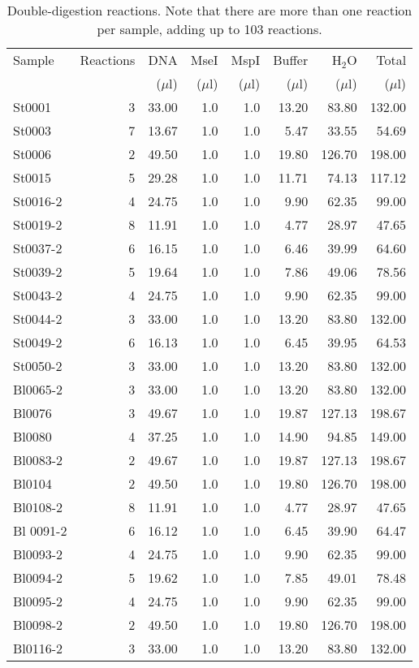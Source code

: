 \documentclass[a4paper,12pt,twosided]{article}
\begin{document}
\begin{table}
\begin{center}
\caption{Double-digestion reactions. Note that there are more than one reaction per sample, adding up to 103 reactions.}\label{tau:digest}
\vspace*{0.2cm}
\begin{tabular}{lrrrrrrr}
\toprule
Sample&Reactions&DNA&MseI&MspI&Buffer&H$_2$O&Total\\
&&($\mu$l)&($\mu$l)&($\mu$l)&($\mu$l)&($\mu$l)&($\mu$l)\\
\midrule
St0001&3&33.00&1.0&1.0&13.20&83.80&132.00\\
St0003&7&13.67&1.0&1.0&5.47&33.55&54.69\\
St0006&2&49.50&1.0&1.0&19.80&126.70&198.00\\
St0015&5&29.28&1.0&1.0&11.71&74.13&117.12\\
St0016-2&4&24.75&1.0&1.0&9.90&62.35&99.00\\
St0019-2&8&11.91&1.0&1.0&4.77&28.97&47.65\\
St0037-2&6&16.15&1.0&1.0&6.46&39.99&64.60\\
St0039-2&5&19.64&1.0&1.0&7.86&49.06&78.56\\
St0043-2&4&24.75&1.0&1.0&9.90&62.35&99.00\\
St0044-2&3&33.00&1.0&1.0&13.20&83.80&132.00\\
St0049-2&6&16.13&1.0&1.0&6.45&39.95&64.53\\
St0050-2&3&33.00&1.0&1.0&13.20&83.80&132.00\\
Bl0065-2&3&33.00&1.0&1.0&13.20&83.80&132.00\\
Bl0076&3&49.67&1.0&1.0&19.87&127.13&198.67\\
Bl0080&4&37.25&1.0&1.0&14.90&94.85&149.00\\
Bl0083-2&2&49.67&1.0&1.0&19.87&127.13&198.67\\
Bl0104&2&49.50&1.0&1.0&19.80&126.70&198.00\\
Bl0108-2&8&11.91&1.0&1.0&4.77&28.97&47.65\\
Bl 0091-2&6&16.12&1.0&1.0&6.45&39.90&64.47\\
Bl0093-2&4&24.75&1.0&1.0&9.90&62.35&99.00\\
Bl0094-2&5&19.62&1.0&1.0&7.85&49.01&78.48\\
Bl0095-2&4&24.75&1.0&1.0&9.90&62.35&99.00\\
Bl0098-2&2&49.50&1.0&1.0&19.80&126.70&198.00\\
Bl0116-2&3&33.00&1.0&1.0&13.20&83.80&132.00\\
\bottomrule
\end{tabular}
\end{center}
\end{table}
\end{document}
